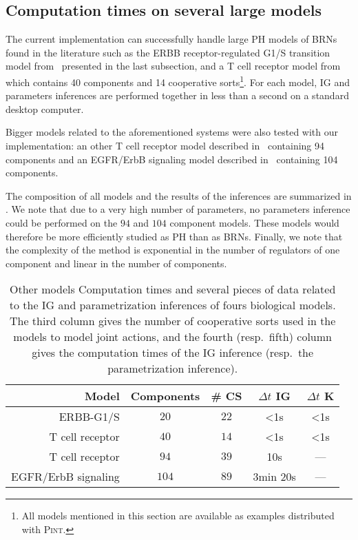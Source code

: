 {\subsection{Computation times on several large models}\label{ssec:cpu}

The current implementation can successfully handle large PH models of BRNs found in the literature
such as the ERBB receptor-regulated G1/S transition model from~\cite{Sahin09} presented in the last subsection,
and a T cell receptor model from~\cite{Klamt06} which contains 40 components and 14 cooperative
sorts\footnote{All models mentioned in this section are available as examples distributed with \textsc{Pint}.}.
For each model, IG and parameters inferences are performed together in less than a second
on a standard desktop computer.

Bigger models related to the aforementioned systems were also tested with our implementation:
an other T cell receptor model described in~\cite{SaezRodriguez2007} containing 94 components
and an EGFR/ErbB signaling model described in~\cite{Samaga2009} containing 104 components.

The composition of all models and the results of the inferences are summarized in .
We note that due to a very high number of parameters, no parameters inference could be performed on the $94$ and $104$ component models.
These models would therefore be more efficiently studied as PH than as BRNs.
Finally, we note that the complexity of the method is exponential in the number of regulators of one
component and linear in the number of components.

\begin{table}
\begin{center}
  \begin{tabular}{r|c|c|c|c}
    \textbf{Model} & \textbf{Components} & \textbf{\# CS} & \textbf{$\Delta t$ IG} & \textbf{$\Delta t$ K}
\\\hline\hline
    ERBB-G1/S \cite{Sahin09} & $20$ & $22$ & <1s & <1s
\\\hline
    T cell receptor \cite{Klamt06} & $40$ & $14$ & <1s & <1s
\\\hline
    T cell receptor \cite{SaezRodriguez2007} & $94$ & $39$ & 10s & ---
\\\hline
    EGFR/ErbB signaling \cite{Samaga2009} & $104$ & $89$ & 3min 20s & ---
  \end{tabular}
\end{center}
  \caption{Other models 
  Computation times and several pieces of data related to the IG and parametrization inferences of fours biological models.
  The third column gives the number of cooperative sorts used in the models to model joint actions,
  and the fourth (resp.~fifth) column gives the computation times of the IG inference (resp.~the parametrization inference).
  }
  \label{tb:computation}
\end{table}
}%



